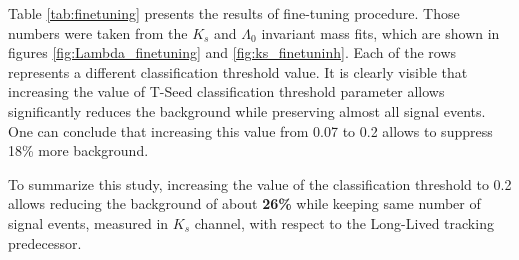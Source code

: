 Table \ref{tab:finetuning} presents the results of fine-tuning procedure. Those numbers were taken from the $K_s$ and $\Lambda_0$ invariant mass fits, which are shown in figures \ref{fig:Lambda_finetuning} and \ref{fig:ks_finetuninh}. Each of the rows represents a different classification threshold value. It is clearly visible that increasing the value of T-Seed classification threshold parameter allows significantly reduces the background while preserving almost all signal events. One can conclude that increasing this value from 0.07 to 0.2 allows to suppress 18\% more background.  

To summarize this study, increasing the value of the classification threshold to 0.2 allows reducing the background of about \textbf{ 26\%} while keeping same number of signal events, measured in $K_s$ channel, with respect to the Long-Lived tracking predecessor. 

